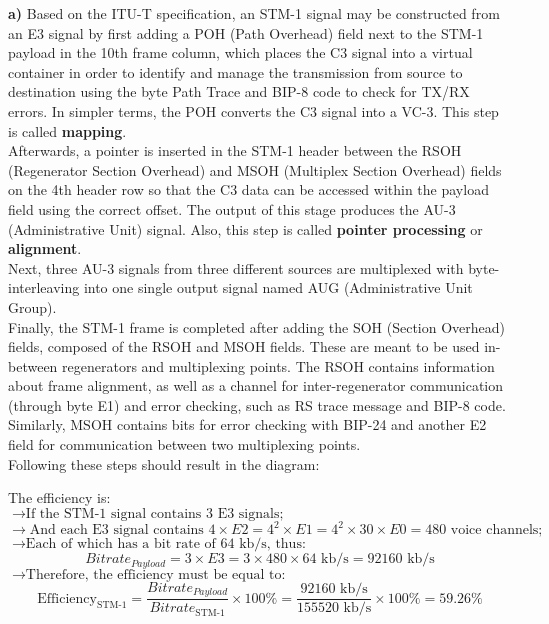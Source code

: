 \large\textbf{a)} \normalsize
Based on the ITU-T specification, an STM-1 signal may be constructed from an E3 signal by first adding a POH (Path Overhead) field next to the STM-1 payload in the 10th frame column, which places the C3 signal into a virtual container in order to identify and manage the transmission from source to destination using the byte Path Trace and BIP-8 code to check for TX/RX errors. In simpler terms, the POH converts the C3 signal into a VC-3. This step is called \textbf{mapping}.\\

Afterwards, a pointer is inserted in the STM-1 header between the RSOH (Regenerator Section Overhead) and MSOH (Multiplex Section Overhead) fields on the 4th header row so that the C3 data can be accessed within the payload field using the correct offset. The output of this stage produces the AU-3 (Administrative Unit) signal. Also, this step is called \textbf{pointer processing} or \textbf{alignment}.\\

Next, three AU-3 signals from three different sources are multiplexed with byte-interleaving into one single output signal named AUG (Administrative Unit Group).\\

Finally, the STM-1 frame is completed after adding the SOH (Section Overhead) fields, composed of the RSOH and MSOH fields. These are meant to be used in-between regenerators and multiplexing points. The RSOH contains information about frame alignment, as well as a channel for inter-regenerator communication (through byte E1) and error checking, such as RS trace message and BIP-8 code. Similarly, MSOH contains bits for error checking with BIP-24 and another E2 field for communication between two multiplexing points.\\

Following these steps should result in the diagram:

The efficiency is:\\
$\rightarrow\text{If the STM-1 signal contains 3 E3 signals;}$\\
$\rightarrow\text{And each E3 signal contains } 4\times E2 = 4^2\times E1 = 4^2\times 30\times E0 = 480 \text{ voice channels;}$\\
$\rightarrow\text{Each of which has a bit rate of 64 kb/s, thus: }$
$$Bitrate_{Payload} = 3\times E3 = 3\times 480\times 64 \text{ kb/s} = 92160 \text{ kb/s}$$
$\rightarrow\text{Therefore, the efficiency must be equal to:}$
$$\text{Efficiency}_{\text{STM-1}} = \frac{Bitrate_{Payload}}{Bitrate_{\text{STM-1}}}\times 100\% = \frac{92160\text{ kb/s}}{155520 \text{ kb/s}}\times 100\% = \mathbf{59.26}\%$$

